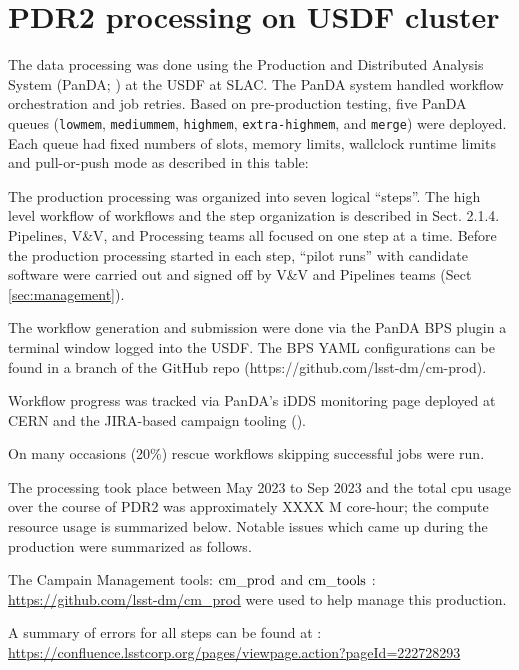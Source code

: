 \section{PDR2 processing on USDF cluster} \label{sec:processing}

The data processing was done using the Production and Distributed Analysis System (PanDA; ) at the USDF at SLAC.
The PanDA system handled workflow orchestration and job retries.
Based on pre-production testing, five PanDA queues (\texttt{lowmem}, \texttt{mediummem}, \texttt{highmem}, \texttt{extra-highmem}, and  \texttt{merge}) were deployed. Each queue had fixed numbers of slots, memory limits, wallclock runtime limits and pull-or-push mode as described in this table:

The production processing was organized into seven logical ``steps''.
The high level workflow of workflows and the step organization is described in  Sect. 2.1.4.
Pipelines, V\&V, and Processing teams all focused on one step at a time.
Before the production processing started in each step, ``pilot runs'' with candidate software were carried out and signed off by V\&V and Pipelines teams
(Sect \ref{sec:management}).

The workflow generation and submission were done via the PanDA BPS plugin a terminal window logged into the USDF.
The BPS YAML configurations can be found in a branch of the  GitHub repo (https://github.com/lsst-dm/cm-prod).

Workflow progress was tracked via PanDA's iDDS monitoring page deployed at CERN and the JIRA-based campaign tooling ().

On many occasions (20\%) rescue workflows skipping successful jobs were run.

The processing took place  between May 2023 to Sep 2023 and the total cpu usage over the course of PDR2 was approximately XXXX M core-hour; the compute resource usage is summarized below.
Notable issues which came up during the production were summarized as follows.

The Campain Management tools: $\rm cm\_prod$ and $\rm cm\_tools$ : \url{https://github.com/lsst-dm/cm_prod} were used to help manage this production.  

A summary of errors for all steps can be found at : \url{https://confluence.lsstcorp.org/pages/viewpage.action?pageId=222728293}

